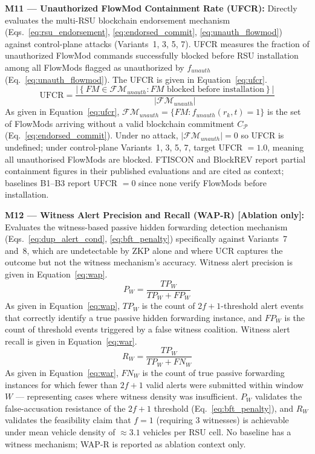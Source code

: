 \documentclass[12pt, a4paper]{report}
\begin{document}
{{\textbf{M11 — Unauthorized FlowMod Containment
Rate (UFCR):}
Directly evaluates the multi-RSU blockchain
endorsement mechanism
(Eqs.~\ref{eq:rsu_endorsement},
\ref{eq:endorsed_commit},
\ref{eq:unauth_flowmod}) against control-plane
attacks (Variants~1, 3, 5, 7). UFCR measures
the fraction of unauthorized FlowMod commands
successfully blocked before RSU installation
among all FlowMods flagged as unauthorized by
$f_{unauth}$ (Eq.~\ref{eq:unauth_flowmod}).
The UFCR is given in
Equation~\eqref{eq:ufcr}.
\begin{equation}
\text{UFCR} =
\frac{\left|\left\{
FM \in \mathcal{FM}_{unauth} :
FM \text{ blocked before installation}
\right\}\right|}{|\mathcal{FM}_{unauth}|}
\label{eq:ufcr}
\end{equation}
As given in Equation~\eqref{eq:ufcr},
$\mathcal{FM}_{unauth} = \{FM :
f_{unauth}(r_k, t) = 1\}$ is the set of
FlowMods arriving without a valid
blockchain commitment $C_\mathcal{P}$
(Eq.~\ref{eq:endorsed_commit}). Under no
attack, $|\mathcal{FM}_{unauth}| = 0$ so
UFCR is undefined; under control-plane
Variants~1, 3, 5, 7, target UFCR $= 1.0$,
meaning all unauthorised FlowMods are
blocked. FTISCON and BlockREV report
partial containment figures in their
published evaluations and are cited as
context; baselines B1--B3 report UFCR $= 0$
since none verify FlowMods before installation.



\textbf{M12 — Witness Alert Precision and Recall
(WAP-R) [Ablation only]:}
Evaluates the witness-based passive hidden
forwarding detection mechanism
(Eqs.~\ref{eq:dup_alert_cond},
\ref{eq:bft_penalty}) specifically against
Variants~7 and~8, which are undetectable by
ZKP alone and where UCR captures the outcome
but not the witness mechanism's accuracy.
Witness alert precision is given in
Equation~\eqref{eq:wap}.
\begin{equation}
P_W =
\frac{TP_W}{TP_W + FP_W}
\label{eq:wap}
\end{equation}
As given in Equation~\eqref{eq:wap},
$TP_W$ is the count of $2f{+}1$-threshold
alert events that correctly identify a true
passive hidden forwarding instance, and
$FP_W$ is the count of threshold events
triggered by a false witness coalition.
Witness alert recall is given in
Equation~\eqref{eq:war}.
\begin{equation}
R_W =
\frac{TP_W}{TP_W + FN_W}
\label{eq:war}
\end{equation}
As given in Equation~\eqref{eq:war},
$FN_W$ is the count of true passive
forwarding instances for which fewer than
$2f{+}1$ valid alerts were submitted
within window $W$ — representing cases
where witness density was insufficient.
$P_W$ validates the false-accusation
resistance of the $2f{+}1$ threshold
(Eq.~\ref{eq:bft_penalty}), and $R_W$
validates the feasibility claim that
$f{=}1$ (requiring 3 witnesses) is
achievable under mean vehicle density of
$\approx 3.1$ vehicles per RSU cell. No
baseline has a witness mechanism;
WAP-R is reported as ablation context only.


}}
\end{document}

